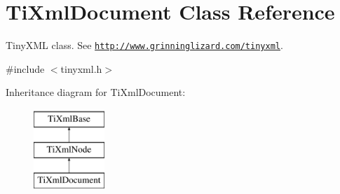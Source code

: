 \hypertarget{class_ti_xml_document}{}\section{Ti\+Xml\+Document Class Reference}
\label{class_ti_xml_document}


Tiny\+X\+ML class. See \href{http://www.grinninglizard.com/tinyxml}{\tt http\+://www.\+grinninglizard.\+com/tinyxml}.  




{\ttfamily \#include $<$tinyxml.\+h$>$}

Inheritance diagram for Ti\+Xml\+Document\+:\begin{figure}[H]
\begin{center}
\leavevmode
\includegraphics[height=3.000000cm]{class_ti_xml_document}
\end{center}
\end{figure}
